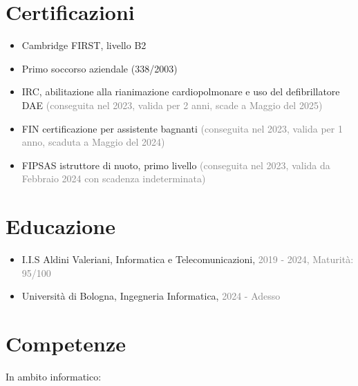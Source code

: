 \documentclass{paper}
\begin{document}
\section{Certificazioni}

\begin{itemize}
    \item Cambridge FIRST, livello B2
    
    \item Primo soccorso aziendale (338/2003)
    
    \item IRC, abilitazione alla rianimazione cardiopolmonare e uso del defibrillatore DAE \textcolor{gray}{(conseguita nel 2023, valida per 2 anni, scade a Maggio del 2025)}
    
    \item FIN certificazione per assistente bagnanti \textcolor{gray}{(conseguita nel 2023, valida per 1 anno, scaduta a Maggio del 2024)}

    \item FIPSAS istruttore di nuoto, primo livello \textcolor{gray}{(conseguita nel 2023, valida da Febbraio 2024 con scadenza indeterminata)}
\end{itemize}

\section{Educazione}

\begin{itemize}
    \item I.I.S Aldini Valeriani, Informatica e Telecomunicazioni, \textcolor{gray}{2019 - 2024, Maturità: 95/100}

    \item Università di Bologna, Ingegneria Informatica, \textcolor{gray}{2024 - Adesso}
\end{itemize}

\section{Competenze}

In ambito informatico:
\end{document}
